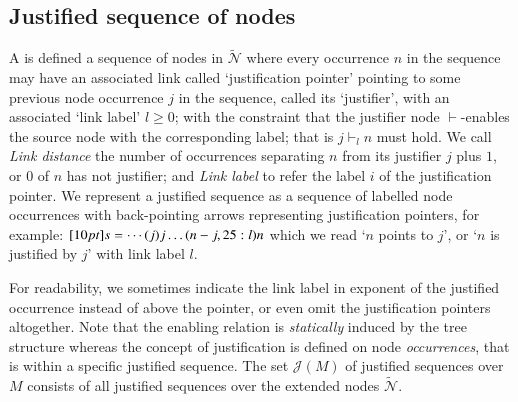 \documentclass{elsarticle}
\theoremstyle{plain}
\theoremstyle{definition}
\newcommand\Nodes{\mathcal{N}}%
\newcommand\ExtendedNodes{\tilde{\Nodes}}
\newcommand{\enables}{\vdash} %
\def\justseqset{\mathcal{J}}
\begin{document}
\subsection{Justified sequence of nodes}
\label{sec:justseq}

A  is defined a sequence of nodes in $\ExtendedNodes$ where every occurrence $n$ in the sequence may have an associated link called `justification pointer' pointing to some previous node occurrence $j$ in the sequence, called its `justifier', with an associated `link label' $l\geq0$; with the constraint that the justifier node $\enables$-enables the source node with the corresponding label; that is $j \enables_l n$ must hold. We call \emph{Link distance} the number of occurrences separating $n$ from its justifier $j$ plus $1$, or $0$ of $n$ has not justifier;
and \emph{Link label} to refer the label $i$ of the justification pointer.
We represent a justified sequence as a sequence of labelled node occurrences with back-pointing arrows representing justification pointers, for example: $\Pstr[10pt]{ s = \cdots (j){j} \ldots (n-j,25:l){n} }$ which we read `$n$ points to $j$', or `$n$ is justified by $j$' with link label $l$.

For readability, we sometimes indicate the link label in exponent of the justified occurrence instead of above the pointer, or even omit the justification pointers altogether.
Note that the enabling relation is \emph{statically} induced by the tree structure whereas the concept of justification is defined on node \emph{occurrences}, that is within a specific justified sequence. The set $\justseqset(M)$ of justified sequences over $M$ consists of all justified sequences over the extended nodes $\ExtendedNodes$.
\end{document}
